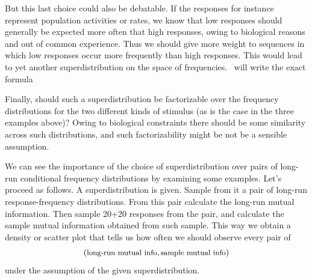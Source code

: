 \documentclass[\ifafour a4paper,12pt,\else a5paper,10pt,\fi%
onecolumn,oneside,article,%
british%
]{memoir}
\theoremstyle{remark}
\theoremstyle{innote}
\renewcommand*{\|}[1][]{\nonscript\,#1\vert\nonscript\;\mathopen{}}
\newcommand*{\puzzle}{{\fontencoding{U}\fontfamily{fontawesometwo}\selectfont\symbol{225}}}
\newcommand{\mynote}[1]{ {\color{notecolour}\puzzle\ #1}}
\begin{document}
But this last choice could also be debatable. If the responses for instance
represent population activities or rates, we know that low responses should
generally be expected more often that high responses, owing to biological
reasons and out of common experience. Thus we should give more weight to
sequences in which low responses occur more frequently than high responses.
This would lead to yet another superdistribution on the space of
frequencies. \mynote{will write the exact formula}

Finally, should such a superdistribution be factorizable over the frequency
distributions for the two different kinds of stimulus (as is the case in
the three examples above)? Owing to biological constraints there should be
some similarity across such distributions, and such factorizability might
be not be a sensible assumption.

\medskip

We can see the importance of the choice of superdistribution over pairs of
long-run conditional frequency distributions by examining some examples.
Let's proceed as follows. A superdistribution is given. Sample from it a
pair of long-run response-frequency distributions. From this pair calculate
the long-run mutual information. Then sample 20+20 responses from the pair,
and calculate the sample mutual information obtained from such sample. This
way we obtain a density or scatter plot that tells us how often we should
observe every pair of
\[(\text{\small long-run mutual info}, \text{\small sample mutual info})\]
under the assumption of the given superdistribution.
\end{document}
